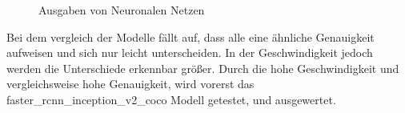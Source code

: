 \documentclass[a4paper,12pt,oneside]{article}
\begin{document}
\begin{figure} 
	[h]
	\centering
    \label{img:Mask} 
    \label{img:Boxes} 
\caption{Ausgaben von Neuronalen Netzen} 
\end{figure} 

\newpage

Bei dem vergleich der Modelle fällt auf, dass alle eine ähnliche Genauigkeit aufweisen und sich nur leicht unterscheiden. In der Geschwindigkeit jedoch werden die Unterschiede erkennbar größer. Durch die hohe Geschwindigkeit und vergleichsweise hohe Genauigkeit, wird vorerst das faster\_rcnn\_inception\_v2\_coco Modell getestet, und ausgewertet.
\\
\end{document}
